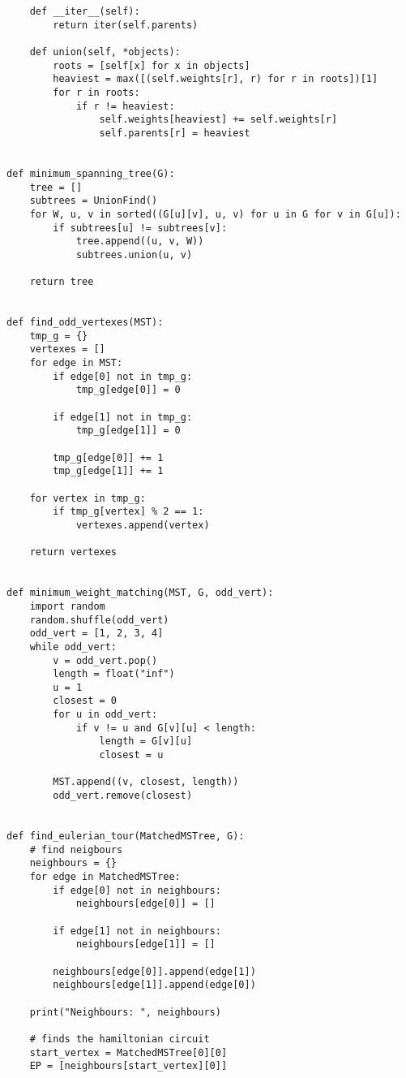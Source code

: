 \documentclass[12pt, letterpaper, twoside]{book}
\begin{document}
\begin{lstlisting}
    def __iter__(self):
        return iter(self.parents)

    def union(self, *objects):
        roots = [self[x] for x in objects]
        heaviest = max([(self.weights[r], r) for r in roots])[1]
        for r in roots:
            if r != heaviest:
                self.weights[heaviest] += self.weights[r]
                self.parents[r] = heaviest


def minimum_spanning_tree(G):
    tree = []
    subtrees = UnionFind()
    for W, u, v in sorted((G[u][v], u, v) for u in G for v in G[u]):
        if subtrees[u] != subtrees[v]:
            tree.append((u, v, W))
            subtrees.union(u, v)

    return tree


def find_odd_vertexes(MST):
    tmp_g = {}
    vertexes = []
    for edge in MST:
        if edge[0] not in tmp_g:
            tmp_g[edge[0]] = 0

        if edge[1] not in tmp_g:
            tmp_g[edge[1]] = 0

        tmp_g[edge[0]] += 1
        tmp_g[edge[1]] += 1

    for vertex in tmp_g:
        if tmp_g[vertex] % 2 == 1:
            vertexes.append(vertex)

    return vertexes


def minimum_weight_matching(MST, G, odd_vert):
    import random
    random.shuffle(odd_vert)
    odd_vert = [1, 2, 3, 4]
    while odd_vert:
        v = odd_vert.pop()
        length = float("inf")
        u = 1
        closest = 0
        for u in odd_vert:
            if v != u and G[v][u] < length:
                length = G[v][u]
                closest = u

        MST.append((v, closest, length))
        odd_vert.remove(closest)


def find_eulerian_tour(MatchedMSTree, G):
    # find neigbours
    neighbours = {}
    for edge in MatchedMSTree:
        if edge[0] not in neighbours:
            neighbours[edge[0]] = []

        if edge[1] not in neighbours:
            neighbours[edge[1]] = []

        neighbours[edge[0]].append(edge[1])
        neighbours[edge[1]].append(edge[0])

    print("Neighbours: ", neighbours)

    # finds the hamiltonian circuit
    start_vertex = MatchedMSTree[0][0]
    EP = [neighbours[start_vertex][0]]


\end{lstlisting}
\end{document}
